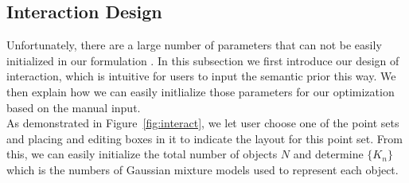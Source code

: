 \subsection{Interaction Design}
\label{sec:imp:interact}
Unfortunately, there are a large number of parameters that can not be easily initialized in our formulation . In this subsection we first introduce our design of interaction, which is intuitive for users to input the semantic prior this way. We then explain how we can easily initlialize those parameters for our optimization based on the manual input.\\
As demonstrated in Figure~\ref{fig:interact}, we let user choose one of the point sets and placing and editing boxes in it to indicate the layout for this point set. From this, we can easily initialize the total number of objects $N$ and determine $\{K_n\}$ which is the numbers of Gaussian mixture models used to represent each object.
